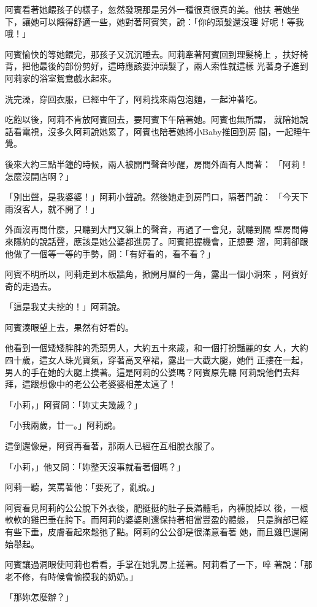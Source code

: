 阿賓看著她餵孩子的樣子，忽然發現那是另外一種很真很真的美。他扶
著她坐下，讓她可以餵得舒適一些，她對著阿賓笑，說：「你的頭髮還沒理
好呢！等我哦！」

阿賓愉快的等她餵完，那孩子又沉沉睡去。阿莉牽著阿賓回到理髮椅上
，扶好椅背，把他最後的部份剪好，這時應該要沖頭髮了，兩人索性就這樣
光著身子進到阿莉家的浴室鴛鴦戲水起來。

洗完澡，穿回衣服，已經中午了，阿莉找來兩包泡麵，一起沖著吃。

吃飽以後，阿莉不肯放阿賓回去，要阿賓下午陪著她。阿賓也無所謂，
就陪她說話看電視，沒多久阿莉說她累了，阿賓也陪著她將小Baby推回到房
間，一起睡午覺。

後來大約三點半鐘的時候，兩人被開門聲音吵醒，房間外面有人問著：
「阿莉！怎麼沒開店啊？」

「別出聲，是我婆婆！」阿莉小聲說。然後她走到房門口，隔著門說：
「今天下雨沒客人，就不開了！」

外面沒再問什麼，只聽到大門又鎖上的聲音，再過了一會兒，就聽到隔
壁房間傳來隱約的說話聲，應該是她公婆都進房了。阿賓把握機會，正想要
溜，阿莉卻跟他做了一個等一等的手勢，問：「有好看的，看不看？」

阿賓不明所以，阿莉走到木板牆角，掀開月曆的一角，露出一個小洞來
，阿賓好奇的走過去。

「這是我丈夫挖的！」阿莉說。

阿賓湊眼望上去，果然有好看的。

他看到一個矮矮胖胖的禿頭男人，大約五十來歲，和一個打扮豔麗的女
人，大約四十歲，這女人珠光寶氣，穿著高叉窄裙，露出一大截大腿，她們
正摟在一起，男人的手在她的大腿上摸著。這是阿莉的公婆嗎？阿賓原先聽
阿莉說他們去拜拜，這跟想像中的老公公老婆婆相差太遠了！

「小莉，」阿賓問：「妳丈夫幾歲？」

「小我兩歲，廿一。」阿莉說。

這倒還像是，阿賓再看著，那兩人已經在互相脫衣服了。

「小莉，」他又問：「妳整天沒事就看著個嗎？」

阿莉一聽，笑罵著他：「要死了，亂說。」

阿賓看見阿莉的公公脫下外衣後，肥挺挺的肚子長滿體毛，內褲脫掉以
後，一根軟軟的雞巴垂在胯下。而阿莉的婆婆則還保持著相當豐盈的體態，
只是胸部已經有些下垂，皮膚看起來鬆弛了點。阿莉的公公卻是很滿意看著
她，而且雞巴還開始舉起。

阿賓讓過洞眼使阿莉也看看，手掌在她乳房上搓著。阿莉看了一下，啐
著說：「那老不修，有時候會偷摸我的奶奶。」

「那妳怎麼辦？」

